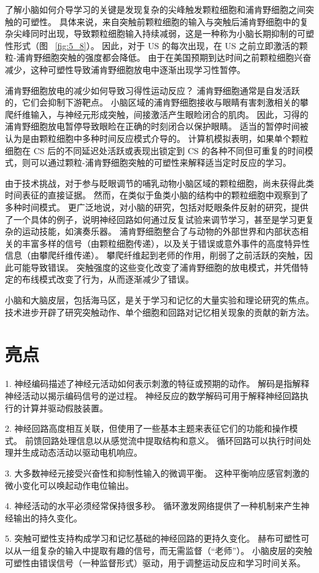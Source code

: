 了解小脑如何介导学习的关键是发现复杂的尖峰触发颗粒细胞和浦肯野细胞之间突触的可塑性。
具体来说，来自突触前颗粒细胞的输入与突触后浦肯野细胞中的复杂尖峰同时出现，导致颗粒细胞输入持续减弱，这是一种称为小脑长期抑制的可塑性形式（图 ~\ref{fig:5_8}）。
因此，对于 US 的每次出现，在 US 之前立即激活的颗粒-浦肯野细胞突触的强度都会降低。
由于在美国预期到达时间之前颗粒细胞兴奋减少，这种可塑性导致浦肯野细胞放电中逐渐出现学习性暂停。


浦肯野细胞放电的减少如何导致习得性运动反应？
浦肯野细胞通常是自发活跃的，它们会抑制下游靶点。 
小脑区域的浦肯野细胞接收与眼睛有害刺激相关的攀爬纤维输入，与神经元形成突触，间接激活产生眼睑闭合的肌肉。
因此，习得的浦肯野细胞放电暂停导致眼睑在正确的时刻闭合以保护眼睛。
适当的暂停时间被认为是由颗粒细胞中多种时间反应模式介导的。
计算机模拟表明，如果单个颗粒细胞在 CS 后的不同延迟处活跃或表现出锁定到 CS 的各种不同但可重复的时间模式，则可以通过颗粒-浦肯野细胞突触的可塑性来解释适当定时反应的学习。


由于技术挑战，对于参与眨眼调节的哺乳动物小脑区域的颗粒细胞，尚未获得此类时间表征的直接证据。
然而，在类似于鱼类小脑的结构中的颗粒细胞中观察到了多种时间模式。
更广泛地说，对小脑的研究，包括对眨眼条件反射的研究，提供了一个具体的例子，说明神经回路如何通过反复试验来调节学习，甚至是学习更复杂的运动技能，如演奏乐器。
浦肯野细胞整合了与动物的外部世界和内部状态相关的丰富多样的信号（由颗粒细胞传递），以及关于错误或意外事件的高度特异性信息（由攀爬纤维传递）。
攀爬纤维起到老师的作用，削弱了之前活跃的突触，因此可能导致错误。
突触强度的这些变化改变了浦肯野细胞的放电模式，并凭借特定的布线模式改变了行为，从而逐渐减少了错误。


小脑和大脑皮层，包括海马区，是关于学习和记忆的大量实验和理论研究的焦点。 
技术进步开辟了研究突触动作、单个细胞和回路对记忆相关现象的贡献的新方法。



\section{亮点}

1. 神经编码描述了神经元活动如何表示刺激的特征或预期的动作。
解码是指解释神经活动以揭示编码信号的逆过程。
神经反应的数学解码可用于解释神经回路执行的计算并驱动假肢装置。 


2. 神经回路高度相互关联，但使用了一些基本主题来表征它们的功能和操作模式。 
前馈回路处理信息以从感觉流中提取结构和意义。 
循环回路可以执行时间处理并生成动态活动以驱动电机响应。


3. 大多数神经元接受兴奋性和抑制性输入的微调平衡。 
这种平衡响应感官刺激的微小变化可以唤起动作电位输出。


4. 神经活动的水平必须经常保持很多秒。 
循环激发网络提供了一种机制来产生神经输出的持久变化。


5. 突触可塑性支持构成学习和记忆基础的神经回路的更持久变化。
赫布可塑性可以从一组复杂的输入中提取有趣的信号，而无需监督（“老师”）。 
小脑皮层的突触可塑性由错误信号（一种监督形式）驱动，用于调整运动反应和学习时间关系。



